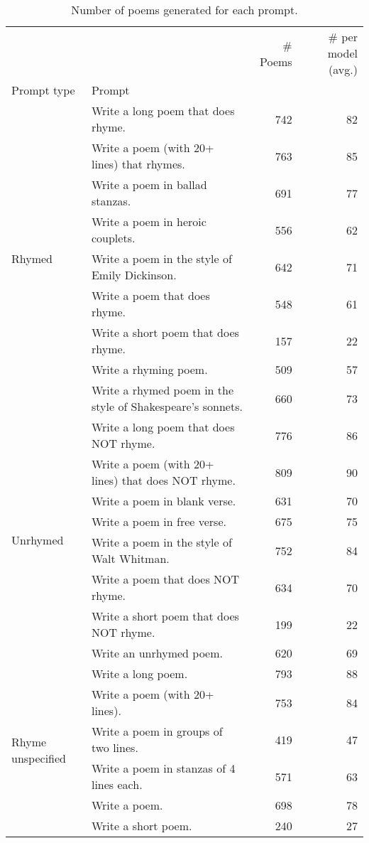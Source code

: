 \begin{table}[H]
  \centering
  \small
  \singlespacing
  \begin{tabular}{llrr}
  \toprule
   &  & \# Poems & \# per model (avg.) \\
  Prompt type & Prompt &  &  \\
  \midrule
  \multirow[t]{9}{*}{Rhymed} & Write a long poem that does rhyme. & 742 & 82 \\
   & Write a poem (with 20+ lines) that rhymes. & 763 & 85 \\
   & Write a poem in ballad stanzas. & 691 & 77 \\
   & Write a poem in heroic couplets. & 556 & 62 \\
   & Write a poem in the style of Emily Dickinson. & 642 & 71 \\
   & Write a poem that does rhyme. & 548 & 61 \\
   & Write a short poem that does rhyme. & 157 & 22 \\
   & Write a rhyming poem. & 509 & 57 \\
   & Write a rhymed poem in the style of Shakespeare's sonnets. & 660 & 73 \\
  \cline{1-4}
  \multirow[t]{8}{*}{Unrhymed} & Write a long poem that does NOT rhyme. & 776 & 86 \\
   & Write a poem (with 20+ lines) that does NOT rhyme. & 809 & 90 \\
   & Write a poem in blank verse. & 631 & 70 \\
   & Write a poem in free verse. & 675 & 75 \\
   & Write a poem in the style of Walt Whitman. & 752 & 84 \\
   & Write a poem that does NOT rhyme. & 634 & 70 \\
   & Write a short poem that does NOT rhyme. & 199 & 22 \\
   & Write an unrhymed poem. & 620 & 69 \\
  \cline{1-4}
  \multirow[t]{6}{*}{Rhyme unspecified} & Write a long poem. & 793 & 88 \\
   & Write a poem (with 20+ lines). & 753 & 84 \\
   & Write a poem in groups of two lines. & 419 & 47 \\
   & Write a poem in stanzas of 4 lines each. & 571 & 63 \\
   & Write a poem. & 698 & 78 \\
   & Write a short poem. & 240 & 27 \\
  \bottomrule
  \end{tabular}
  \caption{Number of poems generated for each prompt.}
  \label{tab:num_poems_rhyme_promptings}
\end{table}
